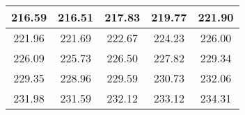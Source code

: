 \begin{large}\begin{tabular}{|c|c|c|c|c|}
\hline
216.59&216.51&217.83&219.77&221.90\\\hline
221.96&221.69&222.67&224.23&226.00\\\hline
226.09&225.73&226.50&227.82&229.34\\\hline
229.35&228.96&229.59&230.73&232.06\\\hline
231.98&231.59&232.12&233.12&234.31\\\hline
\end{tabular}
\end{large}